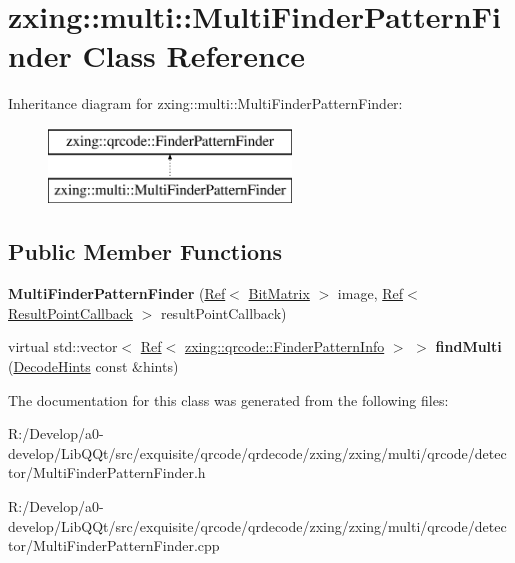 \hypertarget{classzxing_1_1multi_1_1_multi_finder_pattern_finder}{}\section{zxing\+:\+:multi\+:\+:Multi\+Finder\+Pattern\+Finder Class Reference}
\label{classzxing_1_1multi_1_1_multi_finder_pattern_finder}
Inheritance diagram for zxing\+:\+:multi\+:\+:Multi\+Finder\+Pattern\+Finder\+:\begin{figure}[H]
\begin{center}
\leavevmode
\includegraphics[height=2.000000cm]{classzxing_1_1multi_1_1_multi_finder_pattern_finder}
\end{center}
\end{figure}
\subsection*{Public Member Functions}
\begin{DoxyCompactItemize}
\item 
\mbox{\label{classzxing_1_1multi_1_1_multi_finder_pattern_finder_aef4d571d30ff197d3692ea9ff400c186}} 
{\bfseries Multi\+Finder\+Pattern\+Finder} (\mbox{\hyperlink{classzxing_1_1_ref}{Ref}}$<$ \mbox{\hyperlink{classzxing_1_1_bit_matrix}{Bit\+Matrix}} $>$ image, \mbox{\hyperlink{classzxing_1_1_ref}{Ref}}$<$ \mbox{\hyperlink{classzxing_1_1_result_point_callback}{Result\+Point\+Callback}} $>$ result\+Point\+Callback)
\item 
\mbox{\label{classzxing_1_1multi_1_1_multi_finder_pattern_finder_ad61d85cddede5839f42056d75367fc7f}} 
virtual std\+::vector$<$ \mbox{\hyperlink{classzxing_1_1_ref}{Ref}}$<$ \mbox{\hyperlink{classzxing_1_1qrcode_1_1_finder_pattern_info}{zxing\+::qrcode\+::\+Finder\+Pattern\+Info}} $>$ $>$ {\bfseries find\+Multi} (\mbox{\hyperlink{classzxing_1_1_decode_hints}{Decode\+Hints}} const \&hints)
\end{DoxyCompactItemize}


The documentation for this class was generated from the following files\+:\begin{DoxyCompactItemize}
\item 
R\+:/\+Develop/a0-\/develop/\+Lib\+Q\+Qt/src/exquisite/qrcode/qrdecode/zxing/zxing/multi/qrcode/detector/Multi\+Finder\+Pattern\+Finder.\+h\item 
R\+:/\+Develop/a0-\/develop/\+Lib\+Q\+Qt/src/exquisite/qrcode/qrdecode/zxing/zxing/multi/qrcode/detector/Multi\+Finder\+Pattern\+Finder.\+cpp\end{DoxyCompactItemize}

